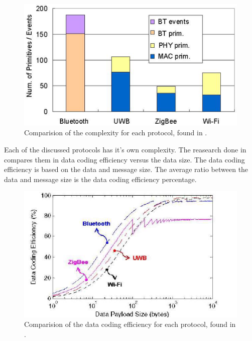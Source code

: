 \documentclass[10pt,a4paper]{article}
\begin{document}
\begin{figure}[H]
   \centering
   \includegraphics[width=1\textwidth]{protocolcomplexity}
   \caption{Comparision of the complexity for each protocol, found in \cite{comparitivestudywirelessprotocols}.}
   \label{fig:protocolcomplexity}
\end{figure}


Each of the discussed protocols has it's own complexity. The reasearch done in \cite{comparitivestudywirelessprotocols} compares them in data coding efficiency versus the data size. The data coding efficiency is based on the data and message size. The average ratio between the data and message size is the data coding efficiency percentage. 

\begin{figure}[H]
   \centering
   \includegraphics[width=1\textwidth]{datacodingefficieny}
   \caption{Comparision of the data coding efficiency for each protocol, found in \cite{comparitivestudywirelessprotocols}.}
   \label{fig:protocolefficiency}
\end{figure}
\end{document}
